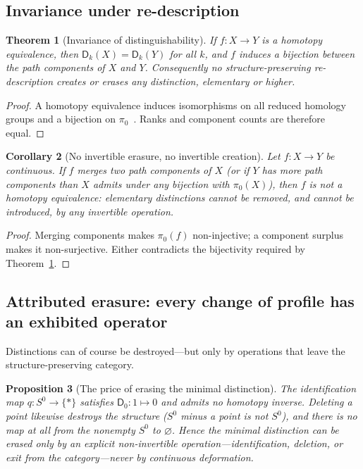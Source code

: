 \documentclass[11pt,a4paper]{article}
\newtheorem{theorem}{Theorem}[section]
\newtheorem{proposition}[theorem]{Proposition}
\newtheorem{corollary}[theorem]{Corollary}
\theoremstyle{definition}
\theoremstyle{remark}
\newcommand{\Szero}{S^{0}}
\newcommand{\Dd}{\mathsf{D}}
\begin{document}
\subsection{Invariance under re-description}

\begin{theorem}[Invariance of distinguishability]
\label{thm:invariance}
If $f:X\to Y$ is a homotopy equivalence, then $\Dd_{k}(X)=\Dd_{k}(Y)$ for all $k$, and $f$
induces a bijection between the path components of $X$ and $Y$.  Consequently no
structure-preserving re-description creates or erases any distinction, elementary or higher.
\end{theorem}

\begin{proof}
A homotopy equivalence induces isomorphisms on all reduced homology groups and a bijection on
$\pi_{0}$~\cite{Hatcher2002}.  Ranks and component counts are therefore equal.
\end{proof}

\begin{corollary}[No invertible erasure, no invertible creation]
\label{cor:no-invertible}
Let $f:X\to Y$ be continuous.  If $f$ merges two path components of $X$ (or if $Y$ has more
path components than $X$ admits under any bijection with $\pi_{0}(X)$), then $f$ is not a
homotopy equivalence: elementary distinctions cannot be removed, and cannot be introduced, by
any invertible operation.
\end{corollary}

\begin{proof}
Merging components makes $\pi_{0}(f)$ non-injective; a component surplus makes it
non-surjective.  Either contradicts the bijectivity required by Theorem~\ref{thm:invariance}.
\end{proof}

\subsection{Attributed erasure: every change of profile has an exhibited operator}

Distinctions can of course be destroyed---but only by operations that leave the
structure-preserving category.

\begin{proposition}[The price of erasing the minimal distinction]
\label{prop:erasure}
The identification map $q:\Szero\to\{*\}$ satisfies $\Dd_{0}:1\mapsto0$ and admits no homotopy
inverse.  Deleting a point likewise destroys the structure ($\Szero$ minus a point is not
$\Szero$), and there is no map at all from the nonempty $\Szero$ to $\varnothing$.  Hence the
minimal distinction can be erased only by an explicit non-invertible operation---identification,
deletion, or exit from the category---never by continuous deformation.
\end{proposition}
\end{document}
